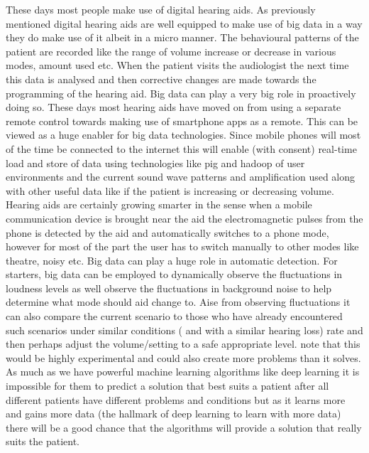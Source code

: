 \documentclass[sigconf]{acmart}
\begin{document}
 These days most people make use of digital hearing aids. As previously mentioned digital hearing aids are well equipped to make use of big data in a way they do make use of it albeit in a micro manner. The behavioural patterns of the patient are recorded like the range of volume increase or decrease in various modes, amount used etc. When the patient visits the audiologist the next time this data is analysed and then corrective changes are made towards the programming of the hearing aid. Big data can play a very big role in proactively doing so. These days most hearing aids have moved on from using a separate remote control towards making use of smartphone apps as a remote. This can be viewed as a huge enabler for big data technologies. Since mobile phones will most of the time be connected to the internet this will enable (with consent) real-time load and store of data using technologies like pig and hadoop of user environments and the current sound wave patterns and amplification used along with other useful data like if the patient is increasing or decreasing volume. Hearing aids are certainly growing smarter in the sense when a mobile communication device is brought near the aid the electromagnetic pulses from the phone is detected by the aid and automatically switches to a phone mode, however for most of the part the user has to switch manually to other modes like theatre, noisy etc. Big data can play a huge role in automatic detection. For starters, big data can be employed to dynamically observe the fluctuations in loudness levels as well observe the fluctuations in background noise to help determine what mode should aid change to. Aise from observing fluctuations it can also compare the current scenario to those who have already encountered such scenarios under similar conditions ( and with a similar hearing loss) rate and then perhaps adjust the volume/setting to a safe appropriate level. note that this would be highly experimental and could also create more problems than it solves. As much as we have powerful machine learning algorithms like deep learning it is impossible for them to predict a solution that best suits a patient after all different patients have different problems and conditions but as it learns more and gains more data (the hallmark of deep learning to learn with more data) there will be a good chance that the algorithms will  provide a solution that really suits the patient.
 \newline
\end{document}
